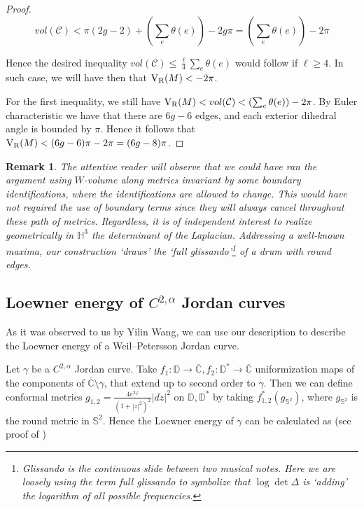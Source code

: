 \documentclass[12pt]{amsart}
\newcommand{\VR}{{\rm V}_{\rm R}}
\newtheorem{remark}{Remark}[section]
\begin{document}
\begin{proof}
\begin{equation}
    vol(\mathcal{C}) < \pi(2g-2) + \left(\sum_e \theta(e)\right) - 2g\pi  = \left(\sum_e \theta(e)\right) -2\pi
\end{equation}

Hence the desired inequality $vol(\mathcal{C})\leq \frac\ell4\sum_e \theta(e)$ would follow if $\ell\geq 4$. In such case, we will have then that $\VR(M)<-2\pi$.

For the first inequality, we still have $\VR(M)< vol(\mathcal{C}) < \left(\sum_e \theta(e)\right) -2\pi$. By Euler characteristic we have that there are $6g-6$ edges, and each exterior dihedral angle is bounded by $\pi$. Hence it follows that $\VR(M)<(6g-6)\pi-2\pi=(6g-8)\pi$.
\end{proof}

\begin{remark}
The attentive reader will observe that we could have ran the argument using $W$-volume along metrics invariant by some boundary identifications, where the identifications are allowed to change. This would have not required the use of boundary terms since they will always cancel throughout these path of metrics. Regardless, it is of independent interest to realize geometrically in $\mathbb{H}^3$ the determinant of the Laplacian. Addressing a well-known maxima, our construction `draws' the `full glissando'\footnote{\emph{Glissando} is the continuous slide between two musical notes. Here we are loosely using the term \emph{full glissando} to symbolize that $\log\det\Delta$ is `adding' the logarithm of all possible frequencies.} of a drum with round edges.
\end{remark}

\subsection{Loewner energy of $C^{2,\alpha}$ Jordan curves}\label{subsec:Loewner}

As it was observed to us by Yilin Wang, we can use our description to describe the Loewner energy of a Weil--Petersson Jordan curve. 

Let $\gamma$ be a $C^{2,\alpha}$ Jordan curve. Take $f_1:\mathbb{D}\rightarrow\overline{\mathbb{C}}, f_2:\mathbb{D}^*\rightarrow\overline{\mathbb{C}}$ uniformization maps of the components of $\overline{\mathbb{C}}\setminus\gamma$, that extend up to second order to $\gamma$. Then we can define conformal metrics $g_{1,2} = \frac{4e^{2\varphi}}{(1+|z|^2)^2}|dz|^2$ on $\mathbb{D}, \mathbb{D}^*$ by taking $f_{1,2}^*(g_{\mathbb{S}^2})$, where $g_{\mathbb{S}^2}$ is the round metric in $\mathbb{S}^2$. Hence the Loewner energy of $\gamma$ can be calculated as (see proof of \cite[Theorem 7.3]{Wang})
\end{document}
